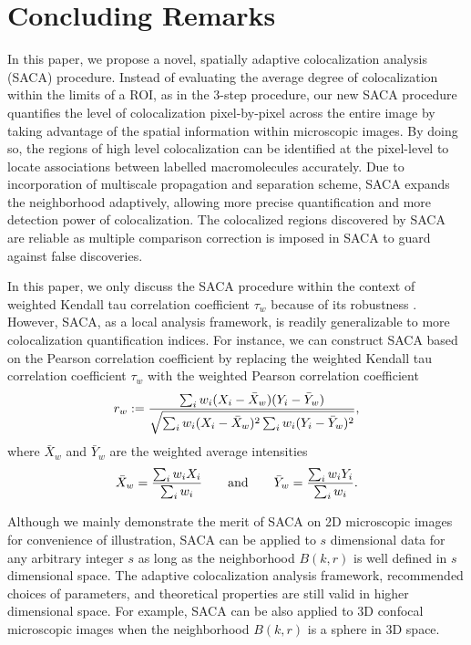 \documentclass[10pt,twocolumn,twoside]{IEEEtran}
\begin{document}
\section{Concluding Remarks}

In this paper, we propose a novel, spatially adaptive colocalization analysis (SACA) procedure. Instead of evaluating the average degree of colocalization within the limits of a ROI, as in the 3-step procedure, our new SACA procedure quantifies the level of colocalization  pixel-by-pixel across the entire image by taking advantage of the spatial information within microscopic images. By doing so, the regions of high level colocalization can be identified at the pixel-level to locate associations between labelled macromolecules accurately. Due to incorporation of multiscale propagation and separation scheme, SACA expands the neighborhood adaptively, allowing more precise quantification and more detection power of colocalization. The colocalized regions discovered by SACA are reliable as multiple comparison correction is imposed in SACA to guard against false discoveries.

In this paper, we only discuss the SACA procedure within the context of weighted Kendall tau correlation coefficient $\tau_w$ because of its robustness \citep[see][]{wang2017}. However, SACA, as a local analysis framework, is readily generalizable to more colocalization quantification indices. For instance, we can construct SACA based on the Pearson correlation coefficient by replacing the weighted Kendall tau correlation coefficient $\tau_w$ with the weighted Pearson correlation coefficient
$$
r_w:={\sum_i w_i(X_i-\bar{X}_w)(Y_i-\bar{Y}_w)\over\sqrt{\sum_iw_i(X_i-\bar{X}_w)^2\sum_iw_i(Y_i-\bar{Y}_w)^2}},
$$
where $\bar{X}_w$ and $\bar{Y}_w$ are the weighted average intensities
$$
\bar{X}_w={\sum_i w_iX_i\over\sum_i w_i}\qquad{\rm and}\qquad \bar{Y}_w={\sum_i w_iY_i\over\sum_i w_i}.
$$

Although we mainly demonstrate the merit of SACA on 2D microscopic images for convenience of illustration, SACA can be applied to $s$ dimensional data for any arbitrary integer $s$ as long as the neighborhood $B(k,r)$ is well defined in $s$ dimensional space. The adaptive colocalization analysis framework, recommended choices of parameters, and theoretical properties are still valid in higher dimensional space. For example, SACA can be  also applied to 3D confocal microscopic images when the neighborhood $B(k,r)$ is a sphere in 3D space. 
\end{document}
